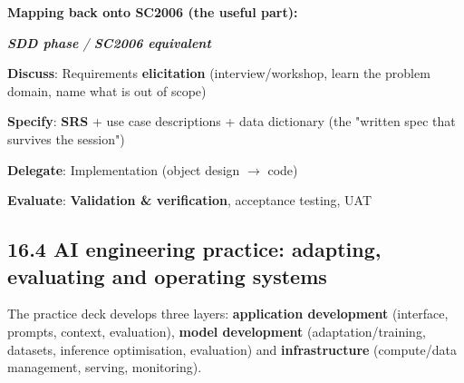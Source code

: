 \begin{studycolumns}
\textbf{Mapping back onto SC2006 (the useful part):}


\begin{referenceentries}
\textit{\textbf{SDD phase} / \textbf{SC2006 equivalent}}\par\smallskip
\noindent \textbf{Discuss}: Requirements \textbf{elicitation} (interview/\allowbreak{}workshop, learn the problem domain, name what is out of scope)\par
\noindent \textbf{Specify}: \textbf{SRS} + use case descriptions + data dictionary (the "written spec that survives the session")\par
\noindent \textbf{Delegate}: Implementation (object design \ensuremath{\rightarrow} code)\par
\noindent \textbf{Evaluate}: \textbf{Validation \& verification}, acceptance testing, UAT\par
\end{referenceentries}


\par\smallskip{\color{line}\hrule}\smallskip
{}
\subsection*{16.4 AI engineering practice: adapting, evaluating and operating systems}
The practice deck develops three layers: \textbf{application development} (interface, prompts, context, evaluation), \textbf{model development} (adaptation/\allowbreak{}training, datasets, inference optimisation, evaluation) and \textbf{infrastructure} (compute/\allowbreak{}data management, serving, monitoring).


\end{studycolumns}
